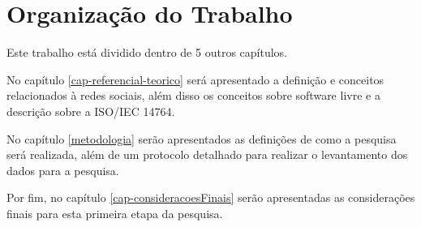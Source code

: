 \section{Organização do Trabalho}

Este trabalho está dividido dentro de 5 outros capítulos. 

No capítulo \ref{cap-referencial-teorico} será apresentado a definição e conceitos relacionados à redes sociais, além disso os conceitos sobre software livre e a descrição sobre a ISO/IEC 14764.

No capítulo \ref{metodologia} serão apresentados as definições de como a pesquisa será realizada, além de um protocolo detalhado para realizar o levantamento dos dados para a pesquisa.

Por fim, no capítulo \ref{cap-consideracoesFinais} serão apresentadas as considerações finais para esta primeira etapa da pesquisa.
